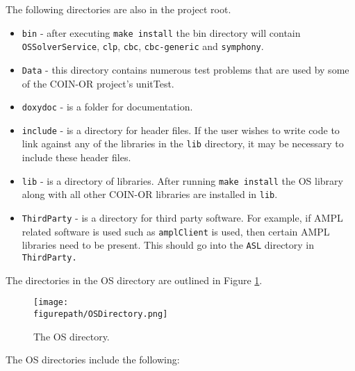 \documentclass[11pt]{article}
\newcommand{\figurepath}{./figures}
\newcounter{Fig}
\renewcommand{\_}{{\char"5F}}
\renewcommand{\{}{{\char"7B}}
\renewcommand{\}}{{\char"7D}}
\renewcommand{\^}{{\char"0D}}
\renewcommand{\'}{{\char"0D}}
\begin{document}
The following directories are also in the project root.
\begin{itemize}
\item {\tt bin} - after executing {\tt make install} the bin directory will contain {\tt OSSolverService}, {\tt clp}, {\tt cbc},  {\tt cbc-generic} and {\tt symphony}.

\item {\tt Data} - this directory contains numerous test problems that are used by some of the COIN-OR project's unitTest.

\item {\tt doxydoc} - is a folder for documentation.

\item {\tt include} - is a directory for header files. If the user wishes to write code to link against any of the libraries in the {\tt lib} directory, it may be necessary to include these header files.

\item {\tt lib} - is a directory of libraries. After running {\tt make install} the OS library along with all other COIN-OR libraries are installed in {\tt lib}.

\item {\tt ThirdParty} - is a  directory for third party software. For example, if AMPL related software is used such as {\tt amplClient} is used, then certain AMPL libraries need to be present. This should go into the {\tt ASL} directory in {\tt ThirdParty.}
\end{itemize}


The directories in the OS directory are outlined in Figure \ref{figure:osdirectory}.


\begin{figure}
\centering
\texttt{[image: \\figurepath/OSDirectory.png]}
\caption{The OS directory.}
\label{figure:osdirectory}
\end{figure}

The OS directories include the following:
\end{document}
